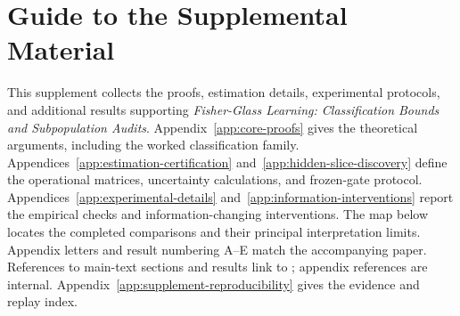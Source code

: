 \section*{Guide to the Supplemental Material}

This supplement collects the proofs, estimation details, experimental protocols,
and additional results supporting \emph{Fisher-Glass Learning: Classification
Bounds and Subpopulation Audits}. Appendix~\ref{app:core-proofs} gives the
theoretical arguments, including the worked classification family.
Appendices~\ref{app:estimation-certification} and~\ref{app:hidden-slice-discovery}
define the operational matrices, uncertainty calculations, and frozen-gate
protocol. Appendices~\ref{app:experimental-details}
and~\ref{app:information-interventions} report the empirical checks and
information-changing interventions. The map below locates the completed
comparisons and their principal interpretation limits. Appendix letters and result numbering A--E match the accompanying paper. References to main-text sections and results link to ; appendix references are internal. Appendix~\ref{app:supplement-reproducibility} gives the evidence and replay index.

